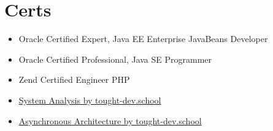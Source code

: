\documentclass[letterpaper,10pt]{article}
\newcommand{\resumeSubHeadingListStart}{\begin{itemize}[leftmargin=*]}
\newcommand{\resumeSubHeadingListEnd}{\end{itemize}}
\begin{document}
  \section{Certs}
    \resumeSubHeadingListStart
      \item
        {Oracle Certified Expert, Java EE Enterprise JavaBeans Developer}
      \item
        {Oracle Certified Professional, Java SE Programmer}
      \item
        {Zend Certified Engineer PHP}
      \item
        \href{https://cert.tough-dev.school/eS8vL3fj6ZMuKuBvqcpKQS/en}{System Analysis by tought-dev.school}
      \item
        \href{https://cert.tough-dev.school/UZcEoycLeUiAcBBUzmb9xs/en}{Asynchronous Architecture by tought-dev.school}
    \resumeSubHeadingListEnd


\end{document}
